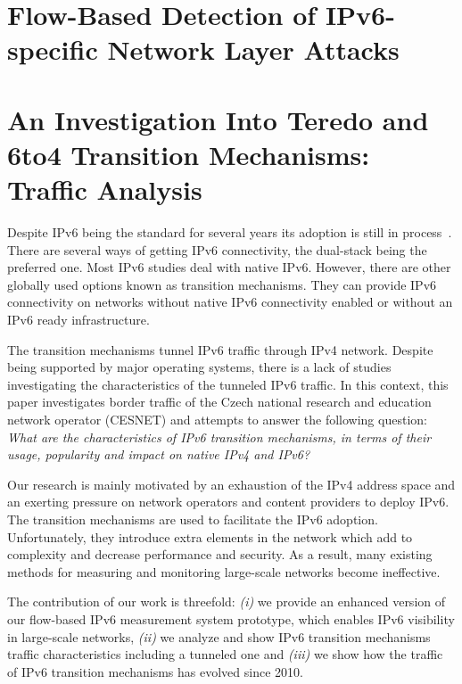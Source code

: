 \section{Flow-Based Detection of IPv6-specific Network Layer Attacks}\label{sec:analysis-ipv6-attacks}

\section{An Investigation Into Teredo and 6to4 Transition Mechanisms: Traffic Analysis}\label{sec:analysis-ipv6-transition}

Despite IPv6 being the standard for several years its adoption is still in process~\cite{claffy}. There are several ways of getting IPv6 connectivity, the dual-stack being the preferred one. Most IPv6 studies deal with native IPv6. However, there are other globally used options known as transition mechanisms. They can provide IPv6 connectivity on networks without native IPv6 connectivity enabled or without an IPv6 ready infrastructure.

The transition mechanisms tunnel IPv6 traffic through IPv4 network. Despite being supported by major operating systems, there is a lack of studies investigating the characteristics of the tunneled IPv6 traffic. In this context, this paper investigates border traffic of the Czech national research and education network operator (CESNET) and attempts to answer the following question: \emph{What are the characteristics of IPv6 transition mechanisms, in terms of their usage, popularity and impact on native IPv4 and IPv6?}

Our research is mainly motivated by an exhaustion of the IPv4 address space and an exerting pressure on network operators and content providers to deploy IPv6. The transition mechanisms are used to facilitate the IPv6 adoption. Unfortunately, they introduce extra elements in the network which add to complexity and decrease performance and security. As a result, many existing methods for measuring and monitoring large-scale networks become ineffective.

The contribution of our work is threefold: \emph{(i)} we provide an enhanced version of our flow-based IPv6 measurement system prototype, which enables IPv6 visibility in large-scale networks, \emph{(ii)} we analyze and show IPv6 transition mechanisms traffic characteristics including a tunneled one and \emph{(iii)} we show how the traffic of IPv6 transition mechanisms has evolved since 2010.

